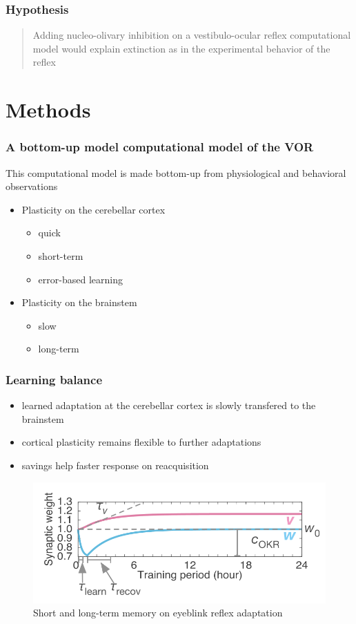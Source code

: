 \documentclass[10pt, compress]{beamer}
\begin{document}
\begin{frame}[fragile]
  \frametitle{Hypothesis}
  \begin{quote}
    Adding nucleo-olivary inhibition on a vestibulo-ocular reflex computational model would explain extinction as in the experimental behavior of the reflex
  \end{quote}
\end{frame}

\section{Methods}

\begin{frame}[fragile]
  \frametitle{A bottom-up model computational model of the VOR}
  This computational model is made bottom-up from physiological and behavioral observations
  \begin{itemize}
    \item Plasticity on the cerebellar cortex
    \begin{itemize}
      \item quick
      \item short-term
      \item error-based learning
    \end{itemize}
    \item Plasticity on the brainstem
    \begin{itemize}
      \item slow
      \item long-term
    \end{itemize}
  \end{itemize}
  \cite{Clopath2014}
\end{frame}

\begin{frame}[fragile]
  \frametitle{Learning balance}
  \begin{itemize}
    \item learned adaptation at the cerebellar cortex is slowly transfered to the brainstem
    \item cortical plasticity remains flexible to further adaptations
    \item savings help faster response on reacquisition
  \end{itemize}
  \begin{figure}
    \includegraphics[scale=0.3]{images/okr_memory.png}
    \caption{Short and long-term memory on eyeblink reflex adaptation \cite{Yamazaki2015}}
  \end{figure}
\end{frame}
\end{document}
